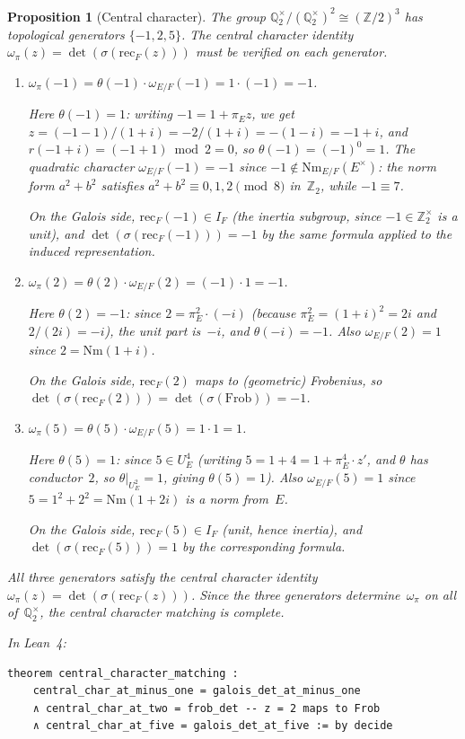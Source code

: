 \documentclass[11pt]{article}
\theoremstyle{plain}
\newtheorem{proposition}[theorem]{Proposition}
\theoremstyle{definition}
\theoremstyle{remark}
\newcommand{\Z}{\mathbb{Z}}
\newcommand{\Q}{\mathbb{Q}}
\newcommand{\Frob}{\mathrm{Frob}}
\newcommand{\Nm}{\mathrm{Nm}}
\newcommand{\rec}{\mathrm{rec}}
\begin{document}
\begin{proposition}[Central character]\label{prop:central}
The group $\Q_2^\times / (\Q_2^\times)^2 \cong (\Z/2)^3$
has topological generators $\{-1, 2, 5\}$.  The central
character identity $\omega_\pi(z) = \det(\sigma(\rec_F(z)))$
must be verified on each generator.

\begin{enumerate}[nosep,label=(\alph*)]
\item $\omega_\pi(-1) = \theta(-1) \cdot \omega_{E/F}(-1)
  = 1 \cdot (-1) = -1$.

  Here $\theta(-1) = 1$: writing $-1 = 1 + \pi_E z$, we get
  $z = (-1-1)/(1+i) = -2/(1+i) = -(1-i) = -1+i$,
  and $r(-1+i) = (-1+1) \bmod 2 = 0$, so
  $\theta(-1) = (-1)^0 = 1$.
  The quadratic character $\omega_{E/F}(-1) = -1$ since
  $-1 \notin \Nm_{E/F}(E^\times)$: the norm form $a^2 + b^2$
  satisfies $a^2 + b^2 \equiv 0, 1, 2 \pmod{8}$ in~$\Z_2$,
  while $-1 \equiv 7$.

  On the Galois side, $\rec_F(-1) \in I_F$ (the inertia subgroup,
  since $-1 \in \Z_2^\times$ is a unit), and
  $\det(\sigma(\rec_F(-1))) = -1$ by the same formula
  applied to the induced representation.

\item $\omega_\pi(2) = \theta(2) \cdot \omega_{E/F}(2)
  = (-1) \cdot 1 = -1$.

  Here $\theta(2) = -1$: since $2 = \pi_E^2 \cdot (-i)$
  (because $\pi_E^2 = (1+i)^2 = 2i$ and $2/(2i) = -i$),
  the unit part is~$-i$, and $\theta(-i) = -1$.
  Also $\omega_{E/F}(2) = 1$ since $2 = \Nm(1+i)$.

  On the Galois side, $\rec_F(2)$ maps to (geometric)
  Frobenius, so $\det(\sigma(\rec_F(2))) = \det(\sigma(\Frob))
  = -1$.

\item $\omega_\pi(5) = \theta(5) \cdot \omega_{E/F}(5)
  = 1 \cdot 1 = 1$.

  Here $\theta(5) = 1$: since $5 \in U_E^4$ (writing
  $5 = 1 + 4 = 1 + \pi_E^4 \cdot z'$, and $\theta$ has
  conductor~$2$, so $\theta|_{U_E^2} = 1$, giving
  $\theta(5) = 1$).
  Also $\omega_{E/F}(5) = 1$ since $5 = 1^2 + 2^2 = \Nm(1+2i)$
  is a norm from~$E$.

  On the Galois side, $\rec_F(5) \in I_F$ (unit, hence
  inertia), and $\det(\sigma(\rec_F(5))) = 1$ by the
  corresponding formula.
\end{enumerate}
All three generators satisfy the central character identity
$\omega_\pi(z) = \det(\sigma(\rec_F(z)))$.  Since the three
generators determine~$\omega_\pi$ on all of~$\Q_2^\times$,
the central character matching is complete.

In Lean~4:
\begin{lstlisting}
theorem central_character_matching :
    central_char_at_minus_one = galois_det_at_minus_one
    ∧ central_char_at_two = frob_det -- z = 2 maps to Frob
    ∧ central_char_at_five = galois_det_at_five := by decide
\end{lstlisting}
\end{proposition}
\end{document}
